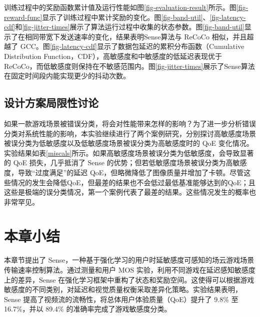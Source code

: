 训练过程中的奖励函数累计值及运行性能如图\ref{fig-evaluation-result}所示。图\ref{fig-reward-func}显示了训练过程中累计奖励的变化。图\ref{fig-band-util}、\ref{fig-latency-cdf}和\ref{fig-jitter-times}展示了算法运行过程中收集的状态参数。图\ref{fig-band-util}显示了在相同带宽下发送速率的变化，结果表明Sense算法与 ReCoCo 相似，并且超越了 GCC。图\ref{fig-latency-cdf}显示了数据包延迟的累积分布函数（Cumulative Distribution Function，CDF），高敏感度和中敏感度的低延迟表现优于 ReCoCo，而低敏感度则保持在不敏感范围内。图\ref{fig-jitter-times}展示了Sense算法在固定时间段内能实现更少的抖动次数。

 

\subsection{设计方案局限性讨论}
如果一款游戏场景被错误分类，将会对性能带来怎样的影响？为了进一步分析错误分类对系统性能的影响，本实验继续进行了两个案例研究，分别探讨高敏感度场景被误分类为低敏感度以及低敏感度场景被误分类为高敏感度时的 QoE 变化情况。实验结果如表\ref{miscals}所示。如果高敏感度场景被误分类为低敏感度，会导致显著的 QoE 损失，几乎抵消了 Sense 的优势；但若低敏感度场景被误分类为高敏感度，导致“过度满足”的延迟 QoE，但略微降低了图像质量并增加了卡顿。尽管这些情况的发生会降低QoE，但最差的结果也不会低过最低基准能够达到的QoE；且这些是极端的误分类情况，第一个案例代表了最差的结果。这些情况发生的概率也非常罕见。
\begin{table}[ht]
\centering
\caption{敏感度误分类对QoE的影响}
\renewcommand\arraystretch{1.25}
\label{miscals}
\end{table}

\section{本章小结}
本章节提出了 Sense，一种基于强化学习的用户时延敏感度可感知的场云游戏场景传输速率控制算法。通过测量和用户 MOS 实验，利用不同游戏在延迟感知敏感度上的差异，Sense 在强化学习框架中重构了状态和奖励空间。这使得可以根据游戏敏感度的不同类别，对延迟和视觉质量权衡采取差异化策略。实验结果表明，Sense 提高了视频流的流畅性，将总体用户体验质量（QoE）提升了 9.8\% 至 16.7\%，并以 89.4\% 的准确率完成了游戏敏感度分类。
















